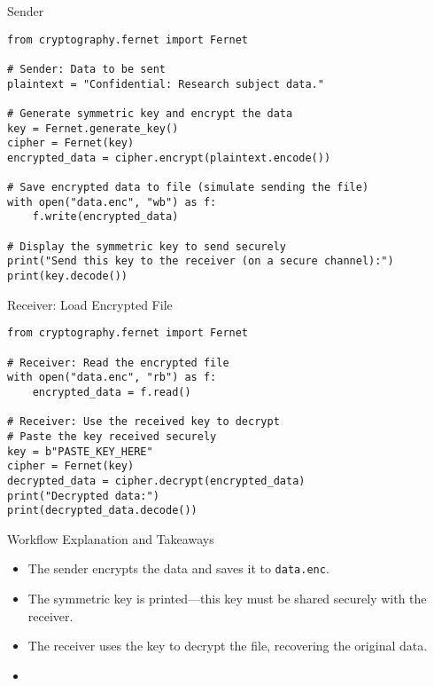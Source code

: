 \documentclass[aspectratio=169]{beamer}
\newcommand{\fn}[1]{%
  \item[] \scriptsize\color{footnote}{#1}
}
\begin{document}
\begin{frame}[fragile]{Sender}
\begin{lstlisting}[style=Python]
from cryptography.fernet import Fernet

# Sender: Data to be sent
plaintext = "Confidential: Research subject data."

# Generate symmetric key and encrypt the data
key = Fernet.generate_key()
cipher = Fernet(key)
encrypted_data = cipher.encrypt(plaintext.encode())

# Save encrypted data to file (simulate sending the file)
with open("data.enc", "wb") as f:
    f.write(encrypted_data)

# Display the symmetric key to send securely
print("Send this key to the receiver (on a secure channel):")
print(key.decode())
\end{lstlisting}
\end{frame}


\begin{frame}[fragile]{Receiver: Load Encrypted File}
\begin{lstlisting}[style=Python]
from cryptography.fernet import Fernet

# Receiver: Read the encrypted file
with open("data.enc", "rb") as f:
    encrypted_data = f.read()

# Receiver: Use the received key to decrypt
# Paste the key received securely
key = b"PASTE_KEY_HERE"
cipher = Fernet(key)
decrypted_data = cipher.decrypt(encrypted_data)
print("Decrypted data:")
print(decrypted_data.decode())
\end{lstlisting}
\end{frame}

\begin{frame}{Workflow Explanation and Takeaways}
\begin{itemize}
  \item The sender encrypts the data and saves it to \texttt{data.enc}.
  \item The symmetric key is printed—this key must be shared securely with the receiver.
  \item The receiver uses the key to decrypt the file, recovering the original data.
  \fn{In practice, always share keys via secure channels (e.g., in-person, via secure messaging, etc.).}
\end{itemize}
\end{frame}

\end{document}
